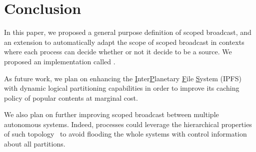 
\section{Conclusion}
\label{sec:conclusion}

In this paper, we proposed a general purpose definition of scoped
broadcast, and an extension to automatically adapt the scope of scoped
broadcast in contexts where each process can decide whether or not it
decide to be a source. We proposed an implementation called \NAME.

As future work, we plan on enhancing the
\underline{I}nter\underline{P}lanetary \underline{F}ile
\underline{S}ystem (IPFS)~\cite{henningsen2020mapping} with dynamic
logical partitioning capabilities in order to improve its caching
policy of popular contents at marginal cost.


\noindent We also plan on further improving scoped broadcast between
multiple autonomous systems. Indeed, processes could leverage the
hierarchical properties of such topology~\cite{nur2018geography} to
avoid flooding the whole systems with control information about all
partitions.

